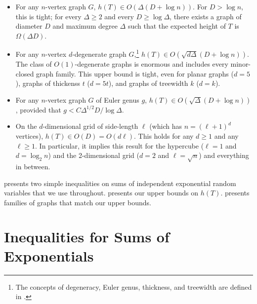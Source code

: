 \documentclass[lotsofwhite]{patmorin}
\begin{document}
\begin{itemize}
  \item For any $n$-vertex graph $G$, $h(T)\in O(\Delta(D+\log n))$.
  For $D>\log n$, this is tight; for every $\Delta\ge 2$ and every $D \ge
  \log\Delta$, there exists a graph of diameter $D$ and maximum degree
  $\Delta$ such that the expected height of $T$ is $\Omega(\Delta D)$.

  \item For any $n$-vertex $d$-degenerate graph $G$,\footnote{The concepts
  of degeneracy, Euler genus, thickness, and treewidth are defined in
  .} $h(T)\in O(\sqrt{d\Delta}(D+\log n))$.
  The class of $O(1)$-degenerate graphs is enormous and includes every
  minor-closed graph family.  This upper bound is tight, even for
  planar graphs ($d=5$), graphs of thickenss $t$ ($d=5t$), and graphs
  of treewidth $k$ ($d=k$).

  \item For any $n$-vertex graph $G$ of Euler genus $g$,
  $h(T)\in O(\sqrt{\Delta}(D+\log n))$, provided that $g <
  C\Delta^{1/2}D/\log\Delta$.

  \item On the $d$-dimensional grid of side-length $\ell$ (which has
  $n=(\ell+1)^d$ vertices), $h(T)\in O(D)=O(d\ell)$. This holds for any $d\ge
  1$ and any $\ell\ge 1$.  In particular, it implies this result for the
  hypercube ($\ell=1$ and $d=\log_2 n$) and the 2-dimensional grid ($d=2$
  and $\ell=\sqrt{n}$) and everything in between.
\end{itemize}

 presents two simple inequalities on sums of
independent exponential random variables that we use throughout.
 presents our upper bounds on $h(T)$.
 presents families of graphs that match our upper
bounds.

\section{Inequalities for Sums of Exponentials}
\end{document}
